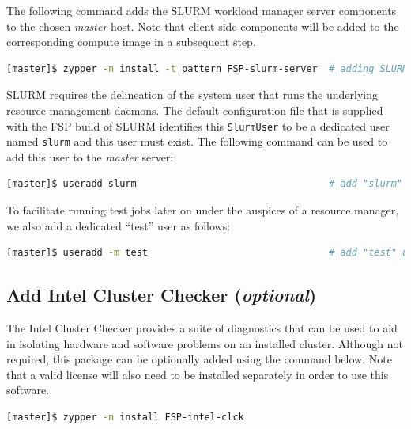 \documentclass[letterpaper]{article}
\begin{document}
The following command adds the SLURM workload manager server components to the
chosen {\em master} host. Note that client-side components will be added to
the corresponding compute image in a subsequent step.

\begin{lstlisting}[language=bash,keywords={}]
[master]$ zypper -n install -t pattern FSP-slurm-server  # adding SLURM server support
\end{lstlisting}

SLURM requires the delineation of the system user that runs the underlying
resource management daemons. The default configuration file that is supplied
with the FSP build of SLURM identifies this \texttt{SlurmUser} to be a
dedicated user named \texttt{slurm} and this user must exist. 
The following command can be used to add this user to the {\em
  master} server:

\begin{lstlisting}[language=bash,keywords={}]
[master]$ useradd slurm                                  # add "slurm" user
\end{lstlisting}

To facilitate running test jobs later on under the auspices of a resource
manager, we also add a dedicated ``test'' user as follows:

\begin{lstlisting}[language=bash,keywords={}]
[master]$ useradd -m test                                # add "test" user
\end{lstlisting}

\subsection{Add Intel Cluster Checker ({\em optional})} \label{sec:add_clck}

The Intel Cluster Checker provides a suite of diagnostics that can be used to
aid in isolating hardware and software problems on an installed
cluster. Although not required, this package can be optionally added using the
command below. Note that a valid license will also need to be installed
separately in order to use this software.

\begin{lstlisting}[language=bash,keywords={}]
[master]$ zypper -n install FSP-intel-clck
\end{lstlisting}
\end{document}
